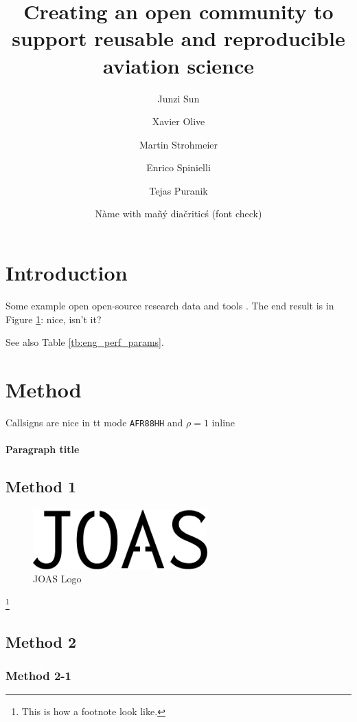 \documentclass[
  manuscript=article,  %
  year=20xx,
  volume=x,
]{joas}
\title{Creating an open community to support reusable and reproducible aviation science}
\author{Junzi Sun}
\affiliation{Joint first authors}
\author{Xavier Olive}
\affiliation{Joint first authors}
\author{Martin Strohmeier}
\affiliation{OpenSky Network, Switzerland}
\author{Enrico Spinielli}
\affiliation{EUROCONTROL, Belgium}
\author{Tejas Puranik}
\affiliation{NASA Ames Research Center, USA}
\author{Nàme with mañý diačriticś (font check)}
\affiliation{University of Syldavia}
\begin{document}
\begin{abstract}
  \blindtext
\end{abstract}


\section{Introduction}

\blindtext Some example open open-source research data \citep{schafer2014bringing} and tools \citep{olive2019traffic,sun2020openap}. The end result is in Figure \ref{fig:logo}: nice, isn't it?


\blindtext[2]

\blindtext See also Table \ref{tb:eng_perf_params}.


\section{Method}

Callsigns are nice in tt mode \texttt{AFR88HH} and $\rho = 1$ inline

\paragraph{Paragraph title} \blindtext

\subsection{Method 1}

\blindtext

\begin{figure}[ht!]
  \centering
  \includegraphics[width=0.6\textwidth]{joas-logo.pdf}
  \caption{JOAS Logo}
  \label{fig:logo}
\end{figure}

\blindtext\footnote{This is how a footnote look like.}

\subsection{Method 2}

\subsubsection{Method 2-1}
\end{document}
